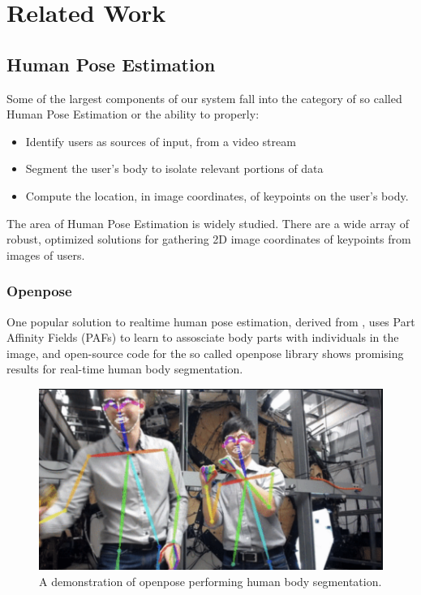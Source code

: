 \documentclass[10pt,twocolumn,letterpaper]{article}
\begin{document}
\section{Related Work}
\subsection{Human Pose Estimation}
Some of the largest components of our system fall into the category of so called Human 
Pose Estimation or the ability to properly:

\begin{itemize}
    \item Identify users as sources of input, from a video stream
    \item Segment the user's body to isolate relevant portions of data
    \item Compute the location, in image coordinates, of keypoints on the user's body.
\end{itemize}

The area of Human Pose Estimation is widely studied. There are a wide array of robust, optimized 
solutions for gathering 2D image coordinates of keypoints from images of users. 

\subsubsection{Openpose}
One popular solution to realtime human pose estimation, derived from \cite{8765346}, 
uses Part Affinity Fields (PAFs) to learn to assosciate body parts with individuals in the image, 
and open-source code for the so called openpose library shows promising results for real-time 
human body segmentation. 

\begin{figure}[h]
    \centering
    \includegraphics[width = .8\linewidth]{images/openpose.png}
    \caption{A demonstration of openpose performing human body segmentation.}
\end{figure}
\end{document}
